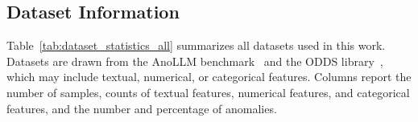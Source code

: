 \subsection{Dataset Information}
\label{sec:app:dataset_information}

Table~\ref{tab:dataset_statistics_all} summarizes all datasets used in this work. Datasets are drawn from the AnoLLM benchmark~\citep{tsai2025anollm} and the ODDS library~\citep{rayana2016odds}, which may include textual, numerical, or categorical features. Columns report the number of samples, counts of textual features, numerical features, and categorical features, and the number and percentage of anomalies.

\begin{table}[t]
\centering
\caption{Statistics for all datasets used in this work. Datasets are drawn from the AnoLLM benchmark~\citep{tsai2025anollm} and the ODDS library~\citep{rayana2016odds}.}
\label{tab:dataset_statistics_all}

\small
\setlength{\tabcolsep}{6pt}
\renewcommand{\arraystretch}{1.15}


\end{table}
